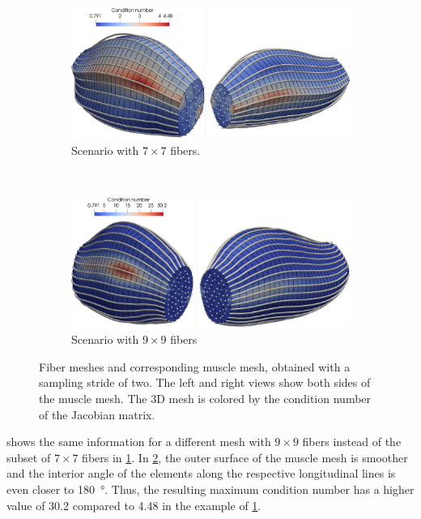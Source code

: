 \begin{figure}%
  \centering%
  \begin{subfigure}{0.9\textwidth}
    \centering
    \includegraphics[width=\textwidth]{images/implementation/condition_number.png}%
    \caption{Scenario with $7\times 7$ fibers.}%
    \label{fig:condition_number7x7}%
  \end{subfigure}\\[4mm]
  \begin{subfigure}{0.9\textwidth}
    \centering
    \includegraphics[width=\textwidth]{images/implementation/condition_number2.png}%
    \caption{Scenario with $9\times 9$ fibers}%
    \label{fig:condition_number9x9}%
  \end{subfigure}
  \caption{Fiber meshes and corresponding muscle mesh, obtained with a sampling stride of two. The left and right views show both sides of the muscle mesh. The 3D mesh is colored by the condition number of the Jacobian matrix.}%
  \label{fig:condition_number2}%
\end{figure}%

 shows the same information for a different mesh with $9\times 9$ fibers instead of the subset of $7\times 7$ fibers in \cref{fig:condition_number7x7}. In \cref{fig:condition_number9x9}, the outer surface of the muscle mesh is smoother and the interior angle of the elements along the respective longitudinal lines is even closer to \SI{180}{\degree}. Thus, the resulting maximum condition number has a higher value of \num{30.2} compared to \num{4.48} in the example of \cref{fig:condition_number7x7}.

